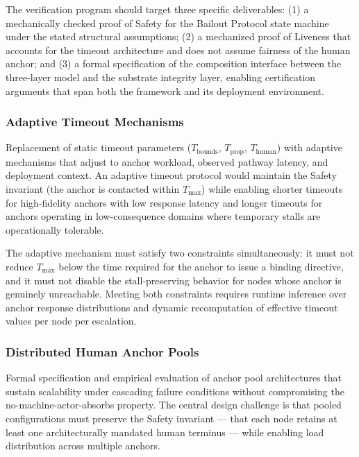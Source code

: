 The verification program should target three specific deliverables: (1) a
mechanically checked proof of Safety for the Bailout Protocol state machine
under the stated structural assumptions; (2) a mechanized proof of Liveness
that accounts for the timeout architecture and does not assume fairness of the
human anchor; and (3) a formal specification of the composition interface between
the \bxthree{} three-layer model and the substrate integrity layer, enabling
certification arguments that span both the framework and its deployment
environment.

\subsubsection{Adaptive Timeout Mechanisms}\label{sec:adaptive-timeouts}

Replacement of static timeout parameters ($T_{\text{bounds}}$,
$T_{\text{prop}}$, $T_{\text{human}}$) with adaptive mechanisms that adjust to
anchor workload, observed pathway latency, and deployment context.  An
adaptive timeout protocol would maintain the Safety invariant (the anchor is
contacted within $T_{\max}$) while enabling shorter timeouts for high-fidelity
anchors with low response latency and longer timeouts for anchors operating in
low-consequence domains where temporary stalls are operationally tolerable.

The adaptive mechanism must satisfy two constraints simultaneously: it must
not reduce $T_{\max}$ below the time required for the anchor to issue a binding
directive, and it must not disable the stall-preserving behavior for nodes
whose anchor is genuinely unreachable.  Meeting both constraints requires
runtime inference over anchor response distributions and dynamic recomputation
of effective timeout values per node per escalation.

\subsubsection{Distributed Human Anchor Pools}\label{sec:anchor-pools}

Formal specification and empirical evaluation of anchor pool architectures that
sustain scalability under cascading failure conditions without compromising the
no-machine-actor-absorbs property.  The central design challenge is that
pooled configurations must preserve the Safety invariant --- that each node
retains at least one architecturally mandated human terminus --- while enabling
load distribution across multiple anchors.

